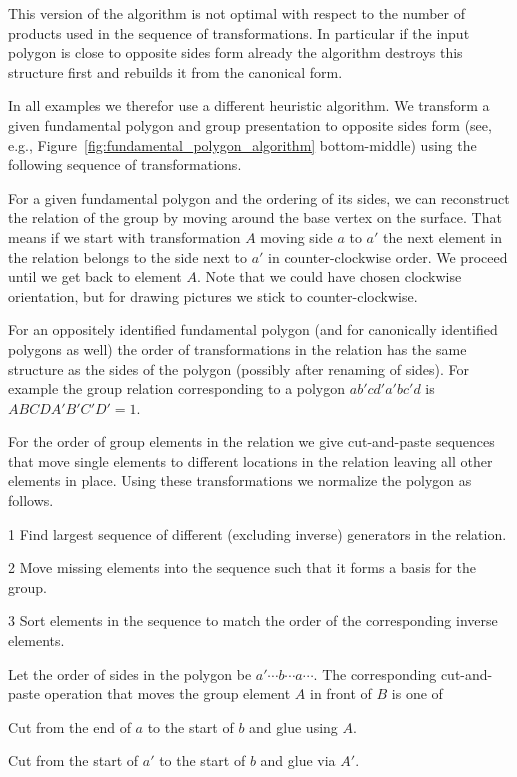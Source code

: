 \documentclass[Thesis.tex]{subfiles}
\begin{document}
This version of the algorithm is not optimal with respect to the number of products used in the sequence of transformations. In particular if the input polygon is close to opposite sides form already the algorithm destroys this structure first and rebuilds it from the canonical form.

In all examples we therefor use a different heuristic algorithm. We transform a given fundamental polygon and group presentation to opposite sides form (see, e.g., Figure~\ref{fig:fundamental_polygon_algorithm} bottom-middle) using the following sequence of transformations.

For a given fundamental polygon and the ordering of its sides, we can reconstruct the relation of the group by moving around the base vertex on the surface. That means if we start with transformation $A$ moving side $a$ to $a'$ the next element in the relation belongs to the side next to $a'$ in counter-clockwise order. We proceed until we get back to element $A$. Note that we could have chosen clockwise orientation, but for drawing pictures we stick to counter-clockwise.

For an oppositely identified fundamental polygon (and for canonically identified polygons as well) the order of transformations in the relation has the same structure as the sides of the polygon (possibly after renaming of sides). For example the group relation corresponding to a polygon $ab'cd'a'bc'd$ is $ABCDA'B'C'D'=1$.

For the order of group elements in the relation we give cut-and-paste sequences that move single elements to different locations in the relation leaving all other elements in place. Using these transformations we normalize the polygon as follows.

\begin{compactitem}
\item[1] Find largest sequence of different (excluding inverse) generators in the relation.
\item[2] Move missing elements into the sequence such that it forms a basis for the group.
\item[3] Sort elements in the sequence to match the order of the corresponding inverse elements.
\end{compactitem}

Let the order of sides in the polygon be $a' \cdots b \cdots a \cdots$. The corresponding cut-and-paste operation that moves the group element $A$ in front of $B$ is one of

\begin{compactitem}
\item Cut from the end of $a$ to the start of $b$ and glue using $A$.
\item Cut from the start of $a'$ to the start of $b$ and glue via $A'$.
\end{compactitem}
\end{document}
